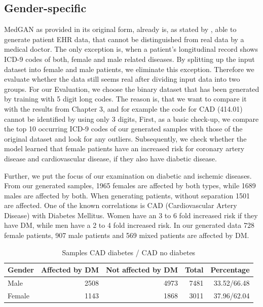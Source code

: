 \documentclass[11pt, a4paper, oneside]{book}
\begin{document}
\subsection{Gender-specific}
MedGAN as provided in its original form, already is, as stated by \citep{Choi2017}, able to generate patient EHR data, that cannot be distinguished from real data by a medical doctor. The only exception is, when a patient's longitudinal record shows ICD-9 codes of both, female and male related diseases.  \citep{Choi2017}
By splitting up the input dataset into female and male patients, we eliminate this exception. Therefore we evaluate whether the data still seems real after dividing input data into two groups. For our Evaluation, we choose the binary dataset that has been generated by training with 5 digit long codes. The reason is, that we want to compare it with the results from Chapter 3, and for example the code for CAD (414.01) cannot be identified by using only 3 digits,
First, as a basic check-up, we compare the top 10 occurring ICD-9 codes of our generated samples with those of the original dataset and look for any outliers. Subsequently, we check whether the model learned that female patients have an increased risk for coronary artery disease and cardiovascular disease, if they also have diabetic disease. 

Further, we put the focus of our examination on diabetic and ischemic diseases. 
From our generated samples, 1965 females are affected by both types, while 1689 males are affected by both. When generating patients, without separation 1501 are affected.
One of the known correlations is CAD (Cardiovascular Artery Disease) with Diabetes Mellitus. Women have an 3 to 6 fold increased risk if they have DM, while men have a 2 to 4 fold increased risk. \citep{juutilainen2004gender}
In our generated data 728 female patients, 907 male patients and 569 mixed patients are affected by DM.

\begin{table}
\begin{tabularx}{\textwidth}{X|r|r|r|r}
Gender & Affected by DM & Not affected by DM & Total & Percentage\\
\hline
Male 	& 2508 & 4973 & 7481 & 33.52/66.48\\
Female & 1143 & 1868 & 3011 & 37.96/62.04\\
\end{tabularx}
\caption{\label{tab:cad-diabetic-synth}Samples CAD diabetes / CAD no diabetes}
\end{table}
\end{document}
